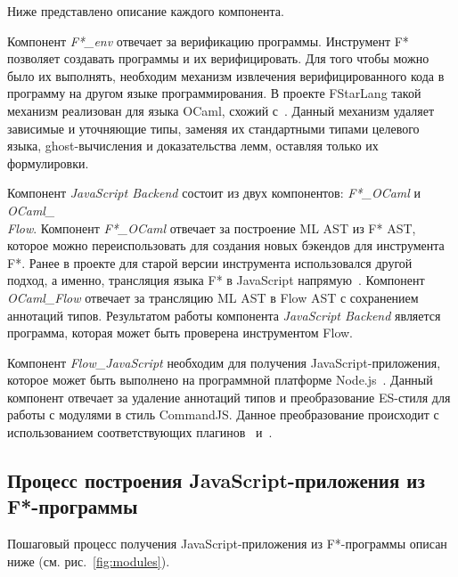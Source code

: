 Ниже представлено описание каждого компонента.

Компонент \textit{F*\_env} отвечает за верификацию программы. Инструмент F* позволяет создавать программы и их верифицировать. Для того чтобы можно было их выполнять, необходим механизм извлечения верифицированного кода в программу на другом языке программирования. В проекте FStarLang такой механизм реализован для языка OCaml, схожий с~\cite{Letouzey2008}. Данный механизм удаляет зависимые и уточняющие типы, заменяя их стандартными типами целевого языка, ghost-вычисления и доказательства лемм, оставляя только их формулировки.

Компонент \textit{JavaScript Backend} состоит из двух компонентов: \textit{F*\_OCaml} и \textit{OCaml\_ \\Flow}. Компонент \textit{F*\_OCaml} отвечает за построение ML AST из F* AST, которое можно переиспользовать для создания новых бэкендов для инструмента F*. Ранее в проекте для старой версии инструмента использовался другой подход, а именно, трансляция языка F* в JavaScript напрямую~\cite{fully_abstract_js}. Компонент \textit{OCaml\_Flow} отвечает за трансляцию ML AST в Flow AST с сохранением аннотаций типов. Результатом работы компонента \textit{JavaScript Backend} является программа, которая может быть проверена инструментом Flow.

Компонент \textit{Flow\_JavaScript} необходим для получения JavaScript-приложения, которое может быть выполнено на программной платформе Node.js~\cite{node_js}. Данный компонент отвечает за удаление аннотаций типов и преобразование ES-стиля для работы с модулями в стиль CommandJS. Данное преобразование происходит с использованием соответствующих плагинов~\cite{flow_plugin} и~\cite{module_plugin}.

\subsection{Процесс построения JavaScript-приложения из F*-программы}

Пошаговый процесс получения JavaScript-приложения из F*-программы описан ниже (см. рис.~\ref{fig:modules}).

